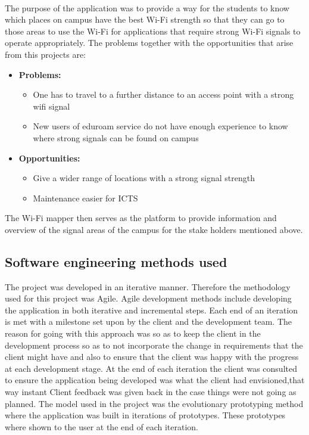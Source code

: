 \paragraph{} 
The purpose of the application was to provide a way for the students to know which places on campus have the best Wi-Fi strength so that they can go to those areas to use the Wi-Fi for applications that require strong Wi-Fi signals to operate appropriately. The problems together with the opportunities that arise from this projects are:
\begin{itemize}
	\item \textbf{Problems:}
	\begin{itemize}
		\item One has to travel to a further distance to an access point with a strong wifi signal
		\item New users of eduroam service do not have enough experience to know where strong
		signals can be found on campus
	\end{itemize}
	\item  \textbf{Opportunities:}
	\begin{itemize}
		\item  Give a wider range of locations with a strong signal strength
		\item Maintenance easier for ICTS
	\end{itemize}
\end{itemize} 
The Wi-Fi mapper then serves as the platform to provide information and overview of the signal areas of the campus for the stake holders mentioned above.
\subsection*{Software engineering methods used}
The project was developed in an iterative manner. Therefore the methodology used for this project was Agile. Agile development methods include developing the application in both iterative and incremental steps. Each end of an iteration is met with a milestone set upon by the client and the development team. The reason for going with this approach  was so as to keep the client in the development process so as to not incorporate the change in requirements that the client might have and also to ensure that the client was happy with the progress at each development stage. At the end of each iteration the client was consulted to ensure the application being developed was what the client had envisioned,that way instant Client feedback was given back in the case things were not going as planned. The model used in the project was the evolutionary prototyping method where the application was built in iterations of prototypes. These prototypes where shown to the user at the end of each iteration.

